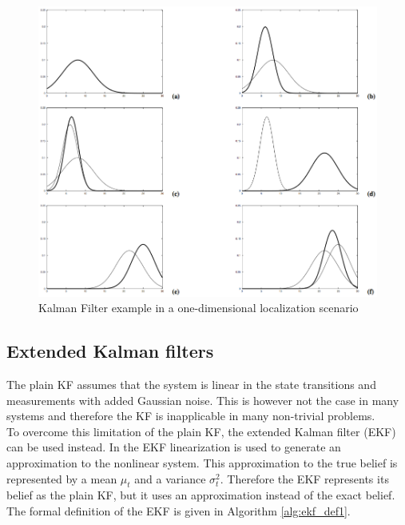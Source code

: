 \begin{figure}[H]
\centering
\includegraphics[scale=0.45]{images/KalmanFilterExample}
\caption{Kalman Filter example in a one-dimensional localization scenario}
\label{fig:kf_ex}
\end{figure}

\subsection{Extended Kalman filters}

The plain KF assumes that the system is linear in the state transitions and measurements with added Gaussian noise. This is however not the case in many systems and therefore the KF is inapplicable in many non-trivial problems.\\

To overcome this limitation of the plain KF, the extended Kalman filter (EKF) can be used instead. In the EKF linearization is used to generate an approximation to the nonlinear system. This approximation to the true belief is represented by a mean $\mu_t$ and a variance $\sigma_t^2$. Therefore the EKF represents its belief as the plain KF, but it uses an approximation instead of the exact belief.\\

The formal definition of the EKF is given in Algorithm \ref{alg:ekf_def1}.

